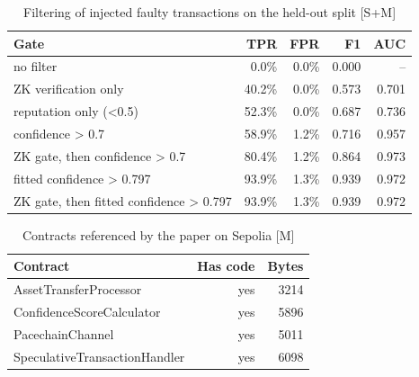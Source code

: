 \begin{table}[t]
\centering
\caption{Filtering of injected faulty transactions on the held-out split [S+M]}
\label{tab:conf}
\begin{tabular}{lrrrr}
\toprule
Gate & TPR & FPR & F1 & AUC \\
\midrule
no filter & 0.0\% & 0.0\% & 0.000 & -- \\
ZK verification only & 40.2\% & 0.0\% & 0.573 & 0.701 \\
reputation only (<0.5) & 52.3\% & 0.0\% & 0.687 & 0.736 \\
confidence > 0.7 & 58.9\% & 1.2\% & 0.716 & 0.957 \\
ZK gate, then confidence > 0.7 & 80.4\% & 1.2\% & 0.864 & 0.973 \\
fitted confidence > 0.797 & 93.9\% & 1.3\% & 0.939 & 0.972 \\
ZK gate, then fitted confidence > 0.797 & 93.9\% & 1.3\% & 0.939 & 0.972 \\
\bottomrule
\end{tabular}
\end{table}

\begin{table}[t]
\centering
\caption{Contracts referenced by the paper on Sepolia [M]}
\label{tab:deployed}
\begin{tabular}{lrr}
\toprule
Contract & Has code & Bytes \\
\midrule
AssetTransferProcessor & yes & 3214 \\
ConfidenceScoreCalculator & yes & 5896 \\
PacechainChannel & yes & 5011 \\
SpeculativeTransactionHandler & yes & 6098 \\
\bottomrule
\end{tabular}
\end{table}
